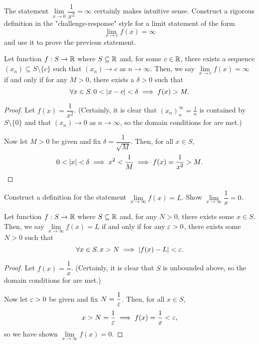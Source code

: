 \begin{problem}
  The statement $\lim\limits_{x \to 0} \dfrac{1}{x^{2}} = \infty$ certainly makes
  intuitive sense. Construct a rigorous definition in the "challenge-response"
  style for a limit statement of the form
    \[
      \lim_{x \to c} f(x) = \infty
    \]
  and use it to prove the previous statement.

  \begin{definition}
    \label{def:limit-to-infty-x-to-finite-real}
    Let function $f : S \to \mathbb{R}$ where $S \subseteq \mathbb{R}$ and, for some $c \in \mathbb{R}$, there exists a
    sequence $(x_{n}) \subseteq S \setminus \{ c \}$ such that $(x_{n}) \to c$ as $n \to \infty$.
    Then, we say $\lim\limits_{x \to c} f(x) = \infty$ if and only if for any
    $M > 0$, there exists a $\delta > 0$ such that
    \[
      \forall x \in S.\, 0 < \left\lvert x - c \right\rvert < \delta \implies f(x) > M.
    \]
  \end{definition}

  \begin{proof}
    Let $f(x) = \dfrac{1}{x^{2}}$. (Certainly, it is clear that
    $(x_{n})_{n}^{\infty} = \frac{1}{n}$ is contained by $S \setminus \{ 0 \}$
    and that $(x_{n}) \to 0$ as $n \to \infty$, so the domain conditions for 
     are met.)

    Now let $M > 0$ be given and fix $\delta = \dfrac{1}{\sqrt{M}}$. 
    Then, for all $x \in S$,
    \[
      0 < \left\lvert x \right\rvert < \delta \implies x^{2} < \frac{1}{M} \implies  f(x) = \frac{1}{x^{2}} > M.
    \]
  \end{proof}

\end{problem}

\begin{problem}
  Construct a definition for the statement $\lim\limits_{x \to \infty} f(x) = L$.
  Show $\lim\limits_{x \to \infty} \dfrac{1}{x} = 0$.

  \begin{definition}
    \label{def:limit-to-finite-real-x-to-infinite}
    Let function $f : S \to \mathbb{R}$ where $S \subseteq \mathbb{R}$ and, for any $N > 0$, there 
    exists some $x \in S$.
    Then, we say $\lim\limits_{x \to \infty} f(x) = L$ if and only if for any
    $\varepsilon > 0$, there exists some $N > 0$ such that
    \[
      \forall x \in S.\, x > N \implies \left\lvert f(x) - L \right\rvert < \varepsilon.
    \]
  \end{definition}

  \begin{proof}
    Let $f(x) = \dfrac{1}{x}$. (Certainly, it is clear that $S$ is unbounded
    above, so the domain conditions for
     are met.)

    Now let $\varepsilon > 0$ be given and fix $N = \dfrac{1}{\varepsilon}$. 
    Then, for all $x \in S$,
    \[
      x > N = \frac{1}{\varepsilon} \implies f(x) = \frac{1}{x} < \varepsilon,
    \]
    so we have shown $\lim\limits_{x \to \infty} f(x) = 0$.
  \end{proof}

\end{problem}

